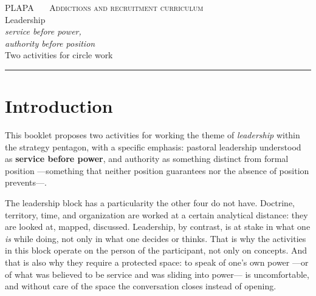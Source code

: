 \documentclass[11pt, a4paper]{article}
\begin{document}

\thispagestyle{plain}
\begin{center}
  \vspace*{1.5em}
  {\color{tenue}\scshape\small PLAPA \ \textbullet\ \ Addictions and recruitment curriculum}\\
  \vspace{2em}
  {\color{liderazgoVino}\Huge Leadership}\\[0.35em]
  {\color{tinte}\LARGE\itshape service before power,}\\[0.15em]
  {\color{tinte}\LARGE\itshape authority before position}\\
  \vspace{1.4em}
  {\color{tenue}\large Two activities for circle work}\\
  \vspace{0.6em}
  {\color{regla}\rule{0.35\linewidth}{0.5pt}}
\end{center}

\vspace{2em}

\section*{Introduction}

This booklet proposes two activities for working the theme of \emph{leadership} within the strategy pentagon, with a specific emphasis: pastoral leadership understood as \textbf{service before power}, and authority as something distinct from formal position ---something that neither position guarantees nor the absence of position prevents---.

The leadership block has a particularity the other four do not have. Doctrine, territory, time, and organization are worked at a certain analytical distance: they are looked at, mapped, discussed. Leadership, by contrast, is at stake in what one \emph{is} while doing, not only in what one decides or thinks. That is why the activities in this block operate on the person of the participant, not only on concepts. And that is also why they require a protected space: to speak of one's own power ---or of what was believed to be service and was sliding into power--- is uncomfortable, and without care of the space the conversation closes instead of opening.
\end{document}

